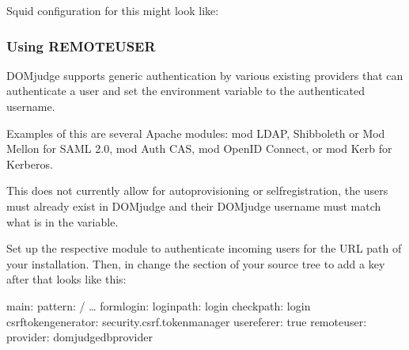\documentclass[a4paper,10pt,english,openany]{sphinxmanual}
\begin{document}
\sphinxAtStartPar
Squid configuration for this might look like:

\begin{sphinxVerbatim}[commandchars=\\\{\}]
   
   
   
\end{sphinxVerbatim}


\subsubsection{Using REMOTE\sphinxhyphen{}USER}
\label{\detokenize{config-advanced:using-remote-user}}
\sphinxAtStartPar
DOMjudge supports generic authentication by various existing providers that
can authenticate a user and set the  environment variable
to the authenticated username.

\sphinxAtStartPar
Examples of this are several Apache modules: mod LDAP, Shibboleth or
Mod Mellon for SAML 2.0, mod Auth CAS, mod OpenID Connect, or mod Kerb for
Kerberos.

\sphinxAtStartPar
This does not currently allow for auto\sphinxhyphen{}provisioning or self\sphinxhyphen{}registration,
the users must already exist in DOMjudge and their DOMjudge username must
match what is in the  variable.

\sphinxAtStartPar
Set up the respective module to authenticate incoming users for the URL
path of your installation. Then, in 
change the  section of your source tree to add a 
key after  that looks like this:

\begin{sphinxVerbatim}[commandchars=\\\{\}]
main:
    pattern: \PYGZca{}/
    …
    form\PYGZus{}login:
        login\PYGZus{}path: login
        check\PYGZus{}path: login
        csrf\PYGZus{}token\PYGZus{}generator: security.csrf.token\PYGZus{}manager
        use\PYGZus{}referer: true
    remote\PYGZus{}user:
        provider: domjudge\PYGZus{}db\PYGZus{}provider
\end{sphinxVerbatim}
\end{document}
